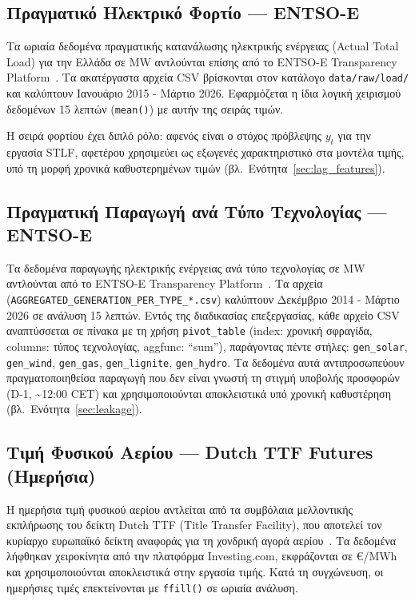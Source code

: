 \subsection{Πραγματικό Ηλεκτρικό Φορτίο — ENTSO-E}

Τα ωριαία δεδομένα πραγματικής κατανάλωσης ηλεκτρικής ενέργειας (Actual Total Load) για
την Ελλάδα σε MW αντλούνται επίσης από το ENTSO-E Transparency
Platform~\cite{entsoe_transparency}. Τα ακατέργαστα αρχεία CSV βρίσκονται στον κατάλογο
\texttt{data/raw/load/} και καλύπτουν Ιανουάριο 2015 - Μάρτιο 2026. Εφαρμόζεται η ίδια
λογική χειρισμού δεδομένων 15 λεπτών (\texttt{mean()}) με αυτήν της σειράς τιμών.

Η σειρά φορτίου έχει διπλό ρόλο: αφενός είναι ο στόχος πρόβλεψης $y_t$ για
την εργασία STLF, αφετέρου χρησιμεύει ως εξωγενές χαρακτηριστικό στα μοντέλα τιμής, υπό
τη μορφή χρονικά καθυστερημένων τιμών (βλ.\ Ενότητα~\ref{sec:lag_features}).


\subsection{Πραγματική Παραγωγή ανά Τύπο Τεχνολογίας — ENTSO-E}

Τα δεδομένα παραγωγής ηλεκτρικής ενέργειας ανά τύπο τεχνολογίας σε MW αντλούνται από
το ENTSO-E Transparency Platform~\cite{entsoe_transparency}. Τα αρχεία
(\texttt{AGGREGATED\_GENERATION\_PER\_TYPE\_*.csv}) καλύπτουν Δεκέμβριο 2014 -
Μάρτιο 2026 σε ανάλυση 15 λεπτών. Εντός της διαδικασίας επεξεργασίας, κάθε αρχείο CSV
αναπτύσσεται σε πίνακα με τη χρήση \texttt{pivot\_table} (index: χρονική σφραγίδα,
columns: τύπος τεχνολογίας, aggfunc: ``sum''), παράγοντας πέντε στήλες:
\texttt{gen\_solar}, \texttt{gen\_wind}, \texttt{gen\_gas}, \texttt{gen\_lignite},
\texttt{gen\_hydro}. Τα δεδομένα αυτά αντιπροσωπεύουν πραγματοποιηθείσα παραγωγή που
δεν είναι γνωστή τη στιγμή υποβολής προσφορών (D-1, \textasciitilde12:00 CET) και
χρησιμοποιούνται αποκλειστικά υπό χρονική καθυστέρηση (βλ.\ Ενότητα~\ref{sec:leakage}).


\subsection{Τιμή Φυσικού Αερίου — Dutch TTF Futures (Ημερήσια)}

Η ημερήσια τιμή φυσικού αερίου αντλείται από τα συμβόλαια μελλοντικής εκπλήρωσης του
δείκτη Dutch TTF (Title Transfer Facility), που αποτελεί τον κυρίαρχο ευρωπαϊκό δείκτη
αναφοράς για τη χονδρική αγορά αερίου~\cite{ttf_gas}. Τα δεδομένα λήφθηκαν χειροκίνητα
από την πλατφόρμα Investing.com, εκφράζονται σε €/MWh και χρησιμοποιούνται αποκλειστικά
στην εργασία τιμής. Κατά τη συγχώνευση, οι ημερήσιες τιμές επεκτείνονται με \texttt{ffill()}
σε ωριαία ανάλυση.

